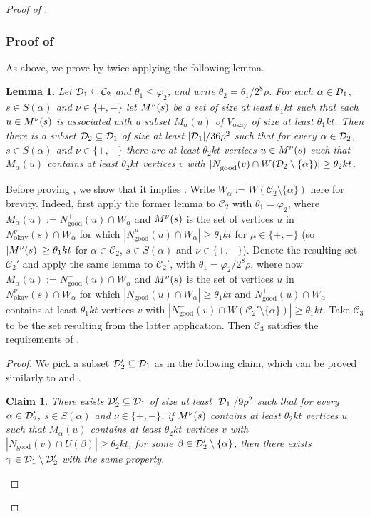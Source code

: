 \documentclass[english]{article}
\theoremstyle{plain}
\newtheorem{lemma}[theorem]{Lemma}
\newtheorem{claim}[theorem]{Claim}
\theoremstyle{remark}
\def\C{\mathcal{C}}
\let\phi\varphi
\def \Vo {V_{\okay}}
\def \Nmu{N^{\mu}_{\good}}
\def \Nnuo{N^{\nu}_{\okay}}
\def \Npg{N^+_{\good}}
\def \Nmg{N^-_{\good}}
\newcommand{\sm}{\setminus}
\DeclareMathOperator{\good}{good}
\DeclareMathOperator{\okay}{okay}
\begin{document}
\begin{proof}[Proof of ]
		\subsubsection{Proof of }

			\def \Ma {M_{\alpha}}
			\def \Wa {W_{\alpha}}
			As above, we prove  by twice applying the following lemma.
			\begin{lemma} \label{lem:available-step-3-modified}
				Let $\D_1 \subseteq \C_2$ and $\theta_1 \le \phi_2$, and write $\theta_2 = \theta_1 / 2^8 \rho$. For each $\alpha \in \mathcal{D}_1$, $s \in S(\alpha)$ and $\nu \in \{+, -\}$ let $M^{\nu}(s)$ be a set of size at least $\theta_1 kt$ such that each $u \in M^{\nu}(s)$ is associated with a subset $\Ma(u)$ of $\Vo$ of size at least $\theta_1 kt$. Then there is a subset $\mathcal{D}_2 \subseteq \mathcal{D}_1$ of size at least $|\mathcal{D}_1| / 36 \rho^2$ such that for every $\alpha \in \mathcal{D}_2$, $s \in S(\alpha)$ and $\nu \in \{+, -\}$ there are at least $\theta_2 kt$ vertices $u \in M^{\nu}(s)$ such that $\Ma(u)$ contains at least $\theta_2 kt$ vertices $v$ with $|\Nmg(v) \cap W(\D_2 \sm \{\alpha\})| \ge \theta_2 kt$.
			\end{lemma}

			Before proving , we show that it implies . Write $\Wa := W(\C_2 \sm \{\alpha\})$ here for brevity. Indeed, first apply the former lemma to $\C_2$ with $\theta_1 = \phi_2$, where $\Ma(u) := \Npg(u) \cap \Wa$ and $M^{\nu}(s)$ is the set of vertices $u$ in $\Nnuo(s) \cap \Wa$ for which $|\Nmu(u) \cap \Wa| \ge \theta_1 kt$ for $\mu \in \{+, -\}$ (so $|M^{\nu}(s)| \ge \theta_1 kt$ for $\alpha \in \C_2$, $s \in S(\alpha)$ and $\nu \in \{+, -\}$). Denote the resulting set $\C_2'$ and apply the same lemma to $\C_2'$, with $\theta_1 = \phi_2 / 2^8 \rho$, where now $\Ma(u) := \Nmg(u) \cap \Wa$ and $M^{\nu}(s)$ is the set of vertices $u$ in $\Nnuo(s) \cap \Wa$ for which $|\Nmg(u) \cap \Wa| \ge \theta_1 kt$ and $\Npg(u) \cap \Wa$ contains at least $\theta_1 kt$ vertices $v$ with $|\Nmg(v) \cap W(\C_2' \sm \{\alpha\})| \ge \theta_1 kt$. Take $\C_3$ to be the set resulting from the latter application. Then $\C_3$ satisfies the requirements of .

			\begin{proof}
				We pick a subset $\mathcal{D}_2' \subseteq \mathcal{D}_1$ as in the following claim, which can be proved similarly to  and . 
				\begin{claim}
					There exists $\mathcal{D}_2' \subseteq \mathcal{D}_1$ of size at least $|\mathcal{D}_1|/9\rho^2$ such that for every $\alpha \in \mathcal{D}_2'$, $s \in S(\alpha)$ and $\nu \in \{+, -\}$, if $M^{\nu}(s)$ contains at least $\theta_2 kt$ vertices $u$ such that $\Ma(u)$ contains at least $\theta_2 kt$ vertices $v$ with $|\Nmg(v) \cap U(\beta)| \ge \theta_2 kt$, for some $\beta \in \mathcal{D}_2' \setminus \{\alpha\}$, then there exists $\gamma \in \mathcal{D}_1 \setminus \mathcal{D}_2'$ with the same property.
				\end{claim}


\end{proof}
\end{proof}
\end{document}

